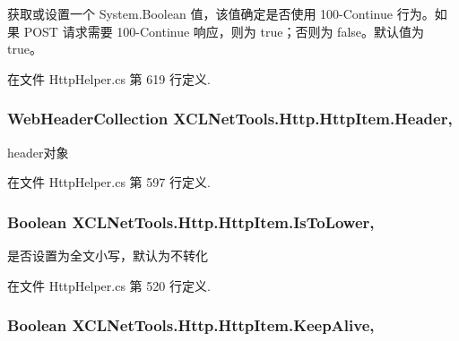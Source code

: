 获取或设置一个 System.\-Boolean 值，该值确定是否使用 100-\/\-Continue 行为。如果 P\-O\-S\-T 请求需要 100-\/\-Continue 响应，则为 true；否则为 false。默认值为 true。 



在文件 Http\-Helper.\-cs 第 619 行定义.

\hypertarget{class_x_c_l_net_tools_1_1_http_1_1_http_item_aae9b9613f672edb6ad77edd5c9a50f8d}{
\subsubsection[{Header}]{\setlength{\rightskip}{0pt plus 5cm}Web\-Header\-Collection X\-C\-L\-Net\-Tools.\-Http.\-Http\-Item.\-Header\hspace{0.3cm}{\ttfamily [get]}, {\ttfamily [set]}}}\label{class_x_c_l_net_tools_1_1_http_1_1_http_item_aae9b9613f672edb6ad77edd5c9a50f8d}


header对象 



在文件 Http\-Helper.\-cs 第 597 行定义.

\hypertarget{class_x_c_l_net_tools_1_1_http_1_1_http_item_a4d89b40173001bf219360543ee506994}{
\subsubsection[{Is\-To\-Lower}]{\setlength{\rightskip}{0pt plus 5cm}Boolean X\-C\-L\-Net\-Tools.\-Http.\-Http\-Item.\-Is\-To\-Lower\hspace{0.3cm}{\ttfamily [get]}, {\ttfamily [set]}}}\label{class_x_c_l_net_tools_1_1_http_1_1_http_item_a4d89b40173001bf219360543ee506994}


是否设置为全文小写，默认为不转化 



在文件 Http\-Helper.\-cs 第 520 行定义.

\hypertarget{class_x_c_l_net_tools_1_1_http_1_1_http_item_a42a8f7d1879653367435ba120fcbe432}{
\subsubsection[{Keep\-Alive}]{\setlength{\rightskip}{0pt plus 5cm}Boolean X\-C\-L\-Net\-Tools.\-Http.\-Http\-Item.\-Keep\-Alive\hspace{0.3cm}{\ttfamily [get]}, {\ttfamily [set]}}}\label{class_x_c_l_net_tools_1_1_http_1_1_http_item_a42a8f7d1879653367435ba120fcbe432}



